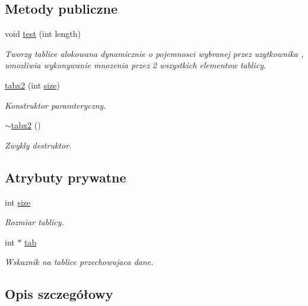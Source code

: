 \subsection*{Metody publiczne}
\begin{DoxyCompactItemize}
\item 
void \hyperlink{classtabx2_a41eea5dffaea0a866db5c574129c0ee4}{test} (int length)
\begin{DoxyCompactList}\small\item\em Tworzy tablice alokowana dynamicznie o pojemnosci wybranej przez uzytkownika , umozliwia wykonywanie mnozenia przez 2 wszystkich elementow tablicy. \end{DoxyCompactList}\item 
\hyperlink{classtabx2_a68be0fc6ed6ce41d56011a6f5bad1b00}{tabx2} (int \hyperlink{classtabx2_a9a6db4f12091baed13f8bad9b9538766}{size})
\begin{DoxyCompactList}\small\item\em Konstruktor paramteryczny. \end{DoxyCompactList}\item 
\hyperlink{classtabx2_a6e259fbc3e5791ae3a11df988a8369c0}{$\sim$tabx2} ()
\begin{DoxyCompactList}\small\item\em Zwykly destruktor. \end{DoxyCompactList}\end{DoxyCompactItemize}
\subsection*{Atrybuty prywatne}
\begin{DoxyCompactItemize}
\item 
int \hyperlink{classtabx2_a9a6db4f12091baed13f8bad9b9538766}{size}
\begin{DoxyCompactList}\small\item\em Rozmiar tablicy. \end{DoxyCompactList}\item 
int $\ast$ \hyperlink{classtabx2_ae3ee40d58c1d3dc6a80c34ca63d337e9}{tab}
\begin{DoxyCompactList}\small\item\em Wskaznik na tablice przechowujaca dane. \end{DoxyCompactList}\end{DoxyCompactItemize}


\subsection{Opis szczegółowy}


